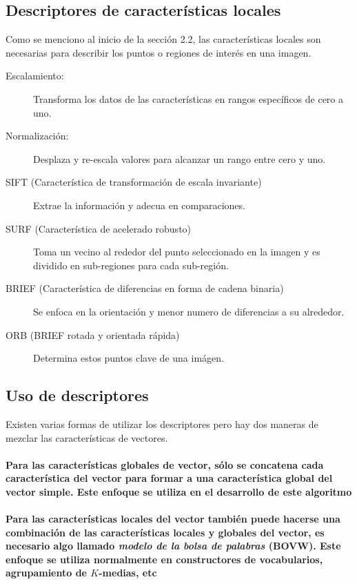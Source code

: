 \documentclass[review]{elsarticle}
\begin{document}
\subsection{Descriptores de características locales}
Como se menciono al inicio de la sección 2.2, las características locales son necesarias para describir los puntos o regiones de interés en una imagen. 

\begin{description}
\item[Escalamiento:]{Transforma los datos de las características en rangos específicos de cero a uno.}

\item[Normalización:]{Desplaza y re-escala valores para alcanzar un rango entre cero y uno.}

\item[SIFT (Característica de transformación de escala invariante)]{Extrae la información y adecua en comparaciones.}

\item[SURF (Característica de acelerado robusto)]{Toma un vecino al rededor del punto seleccionado en la imagen y es dividido en sub-regiones para cada sub-región.}

\item[BRIEF (Característica de diferencias en forma de cadena binaria)]{Se enfoca en la orientación y menor numero de diferencias a su alrededor.}

\item[ORB (BRIEF rotada y orientada rápida)]{Determina estos puntos clave de una imágen.}
\end{description}

\subsection{Uso de descriptores}
Existen varias formas de utilizar los descriptores pero hay dos maneras de mezclar las características de vectores.

\paragraph{Para las características globales de vector, sólo se concatena cada característica del vector para formar a una característica global del vector simple. Este enfoque se utiliza en el desarrollo de este algoritmo} 

\paragraph{Para las características locales del vector también puede hacerse una combinación de las características locales y globales del vector, es necesario algo llamado \emph{modelo de la bolsa de palabras} (BOVW). Este enfoque se utiliza normalmente en constructores de vocabularios, agrupamiento de $K$-medias, etc} 
\end{document}
